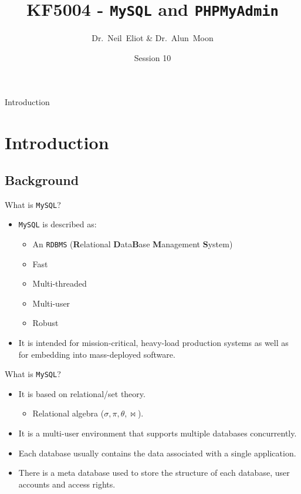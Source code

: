 \documentclass[xcolor=table,aspectratio=169]{beamer}
\title{KF5004 - \texttt{MySQL} and \texttt{PHPMyAdmin}}
\author{Dr.~Neil~Eliot \& Dr.~Alun~Moon}
\institute[Northumbria University] %
{
  Department of Computer and Information Sciences\\
  University of Northumbria
}
\date{Session 10}
\begin{document}
\begin{frame}
  \titlepage
\end{frame}

\begin{frame}{Introduction}
  \tableofcontents
\end{frame}


\section{Introduction}
\subsection{Background}
\begin{frame}{What is \texttt{MySQL}?}
  \begin{itemize}
    \item \texttt{MySQL} is described as:
      \begin{itemize}
        \item An \texttt{RDBMS} (\textbf{R}elational \textbf{D}ata\textbf{B}ase \textbf{M}anagement \textbf{S}ystem)
        \item Fast
        \item Multi-threaded
        \item Multi-user
        \item Robust 
      \end{itemize}
    \item It is intended for mission-critical, heavy-load production systems as well as for embedding into mass-deployed software.
  \end{itemize}
\end{frame}

\begin{frame}{What is \texttt{MySQL}?}
  \begin{itemize}
    \item It is based on relational/set theory.
      \begin{itemize}
        \item Relational algebra ($\sigma,\pi,\theta,\bowtie$). 
      \end{itemize}
    \item It is a multi-user environment that supports multiple databases concurrently.
    \item Each database usually contains the data associated with a single application.
    \item There is a meta database used to store the structure of each database, user accounts and access rights.
  \end{itemize}
\end{frame}
\end{document}
